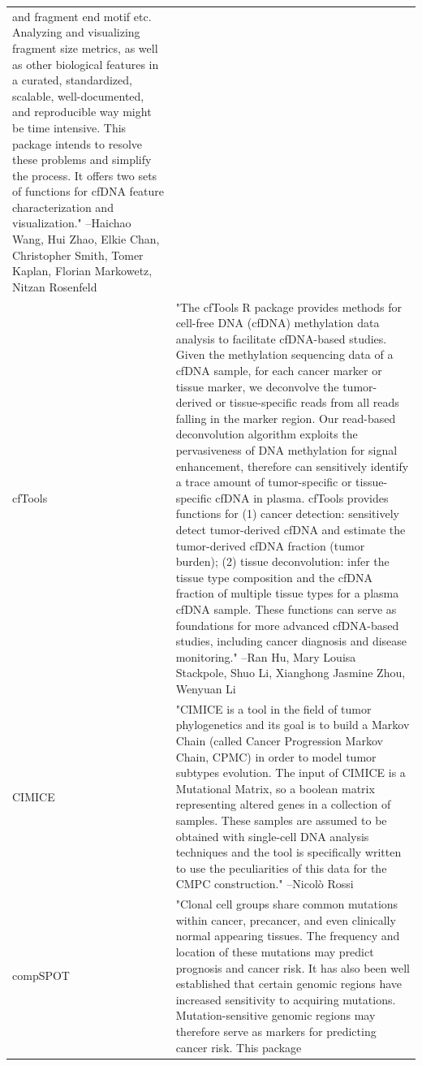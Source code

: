\documentclass[]{article}
\begin{document}
\begin{longtable}[t]{l>{\raggedright\arraybackslash}p{25em}}
and fragment end motif etc. Analyzing and visualizing fragment
size metrics, as well as other biological features in a
curated, standardized, scalable, well-documented, and
reproducible way might be time intensive. This package intends
to resolve these problems and simplify the process. It offers
two sets of functions for cfDNA feature characterization and
visualization." --Haichao Wang, Hui Zhao, Elkie Chan, Christopher Smith, Tomer Kaplan, Florian Markowetz, Nitzan Rosenfeld\\
cfTools & "The cfTools R package provides methods for cell-free DNA
(cfDNA) methylation data analysis to facilitate cfDNA-based
studies. Given the methylation sequencing data of a cfDNA
sample, for each cancer marker or tissue marker, we deconvolve
the tumor-derived or tissue-specific reads from all reads
falling in the marker region. Our read-based deconvolution
algorithm exploits the pervasiveness of DNA methylation for
signal enhancement, therefore can sensitively identify a trace
amount of tumor-specific or tissue-specific cfDNA in plasma.
cfTools provides functions for (1) cancer detection:
sensitively detect tumor-derived cfDNA and estimate the
tumor-derived cfDNA fraction (tumor burden); (2) tissue
deconvolution: infer the tissue type composition and the cfDNA
fraction of multiple tissue types for a plasma cfDNA sample.
These functions can serve as foundations for more advanced
cfDNA-based studies, including cancer diagnosis and disease
monitoring." --Ran Hu, Mary Louisa Stackpole, Shuo Li, Xianghong Jasmine Zhou, Wenyuan Li\\
CIMICE & "CIMICE is a tool in the field of tumor phylogenetics and
its goal is to build a Markov Chain (called Cancer Progression
Markov Chain, CPMC) in order to model tumor subtypes evolution.
The input of CIMICE is a Mutational Matrix, so a boolean matrix
representing altered genes in a collection of samples. These
samples are assumed to be obtained with single-cell DNA
analysis techniques and the tool is specifically written to use
the peculiarities of this data for the CMPC construction." --Nicolò Rossi\\
compSPOT & "Clonal cell groups share common mutations within cancer,
precancer, and even clinically normal appearing tissues. The
frequency and location of these mutations may predict prognosis
and cancer risk. It has also been well established that certain
genomic regions have increased sensitivity to acquiring
mutations. Mutation-sensitive genomic regions may therefore
serve as markers for predicting cancer risk. This package

\end{longtable}
\end{document}
